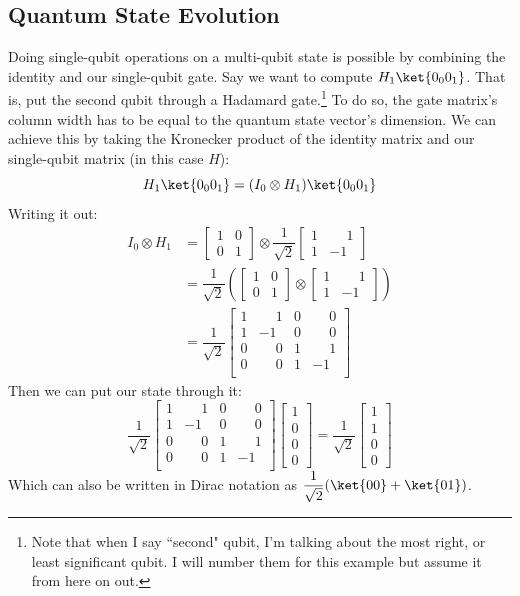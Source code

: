 \documentclass[11pt]{article}
\newcommand{\igate}{
  \begin{bmatrix}
  1 & 0 \\
  0 & 1 
  \end{bmatrix}
}
\newcommand{\hgate}{
  \dfrac{1}{\sqrt2}
  \begin{bmatrix}
  1 & \phantom{-}1 \\
  1 & -1
  \end{bmatrix}
}
\begin{document}
\subsection{Quantum State Evolution}
Doing single-qubit operations on a multi-qubit state is possible by combining the identity and our single-qubit gate. Say we want to compute $H_1\ket{0_0 0_1}$. That is, put the second qubit through a Hadamard gate.\footnote{Note that when I say ``second" qubit, I'm talking about the most right, or least significant qubit. I will number them for this example but assume it from here on out.} To do so, the gate matrix's column width has to be equal to the quantum state vector's dimension. We can achieve this by taking the Kronecker product of the identity matrix and our single-qubit matrix (in this case $H$):
\[
  H_1\ket{0_0 0_1} = (I_0 \otimes H_1)\ket{0_0 0_1}
\]
\newpage
\noindent
Writing it out:
\begin{align}
  I_0 \otimes H_1 &= 
  \igate{} \otimes \hgate{} \\
  &=
  \dfrac{1}{\sqrt2}
  \left(
  \igate{}
  \otimes
  \begin{bmatrix}
  1 & \phantom{-}1 \\
  1 & -1
  \end{bmatrix}
  \right) \\
  &= \dfrac{1}{\sqrt2}
  \begin{bmatrix}
  1 & \phantom{-}1 & 0 & \phantom{-}0 \\
  1 & -1 & 0 & \phantom{-}0 \\
  0 & \phantom{-}0 & 1 & \phantom{-}1 \\
  0 & \phantom{-}0 & 1 & -1 \\
  \end{bmatrix}
\end{align}
Then we can put our  state through it:
\[
  \dfrac{1}{\sqrt2}
  \begin{bmatrix}
  1 & \phantom{-}1 & 0 & \phantom{-}0 \\
  1 & -1 & 0 & \phantom{-}0 \\
  0 & \phantom{-}0 & 1 & \phantom{-}1 \\
  0 & \phantom{-}0 & 1 & -1 \\
  \end{bmatrix}
  \begin{bmatrix}
  1 \\
  0 \\
  0 \\
  0
  \end{bmatrix}
  =
  \dfrac{1}{\sqrt2}
  \begin{bmatrix}
  1 \\
  1 \\
  0 \\
  0
  \end{bmatrix}
\]
Which can also be written in Dirac notation as $\dfrac{1}{\sqrt2}(\ket{00} + \ket{01})$.
\end{document}
